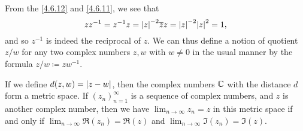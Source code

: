 \begin{note}
  From the \cref{4.6.12} and \cref{4.6.11}, we see that
  \[
    z z^{-1} = z^{-1} z = \abs{z}^{-2} \overline{z} z = \abs{z}^{-2} \abs{z}^2 = 1,
  \]
  and so \(z^{-1}\) is indeed the reciprocal of \(z\).
  We can thus define a notion of quotient \(z / w\) for any two complex numbers \(z, w\) with \(w \neq 0\) in the usual manner by the formula \(z / w \coloneqq z w^{-1}\).
\end{note}

\begin{lem}\label{4.6.13}
  If we define \(d(z, w) = \left\lvert z - w\right\rvert\), then the complex numbers \(\mathbb{C}\) with the distance \(d\) form a metric space.
  If \((z_n)_{n = 1}^\infty\) is a sequence of complex numbers, and \(z\) is another complex number, then we have \(\lim_{n \to \infty} z_n = z\) in this metric space if and only if \(\lim_{n \to \infty} \Re(z_n) = \Re(z)\) and \(\lim_{n \to \infty} \Im(z_n) = \Im(z)\).
\end{lem}

